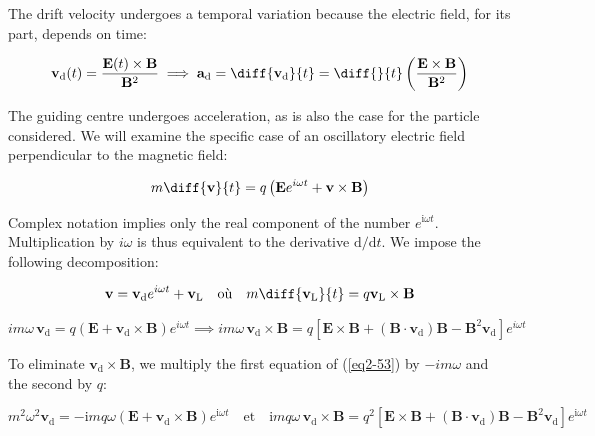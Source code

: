 The drift velocity undergoes a temporal variation because the electric field, for its part, depends on time:

\begin{equation}
    \mathbf{v}_\mathrm{d}(t)=\frac{\mathbf{E}(t)\times\mathbf{B}}{\mathbf{B}^2}\implies\mathbf{a}_\mathrm{d}=\diff{\mathbf{v}_\mathrm{d}}{t}=\diff{}{t}\left(\frac{\mathbf{E}\times\mathbf{B}}{\mathbf{B}^2}\right)
\end{equation}

The guiding centre undergoes acceleration, as is also the case for the particle considered. We will examine the specific case of an oscillatory electric field perpendicular to the magnetic field:

\begin{equation}
    m\diff{\mathbf{v}}{t}=q\left(\mathbf{E}e^{i\omega t}+\mathbf{v}\times\mathbf{B}\right)
\end{equation}

Complex notation implies only the real component of the number $e^{\mathrm{i}\omega t}$. Multiplication by $i\omega$ is thus equivalent to the derivative $\mathrm{d}/\mathrm{d}t$. We impose the following decomposition:

\begin{equation}
    \label{eq2-52}
    \mathbf{v}=\mathbf{v}_\mathrm{d}e^{i\omega t}+\mathbf{v}_\text{L}\quad\text{où}\quad m\diff{\mathbf{v}_\text{L}}{t}=q\mathbf{v}_\text{L}\times\mathbf{B}
\end{equation}

\begin{equation}
    \label{eq2-53}
    im\omega\,\mathbf{v}_\mathrm{d}=q\left(\mathbf{E}+\mathbf{v}_\mathrm{d}\times\mathbf{B}\right)e^{i\omega t}\implies im\omega\,\mathbf{v}_\mathrm{d}\times\mathbf{B}=q\left[\mathbf{E}\times\mathbf{B}+(\mathbf{B\cdot\mathbf{v}_\mathrm{d}})\mathbf{B}-\mathbf{B}^2\mathbf{v}_\mathrm{d}\right]e^{i\omega t}
\end{equation}

To eliminate $\mathbf{v}_\mathrm{d}\times\mathbf{B}$, we multiply the first equation of (\ref{eq2-53}) by $-im\omega$ and the second by $q$:

\begin{equation}
    m^2\omega^2\mathbf{v}_\mathrm{d}=-\mathrm{i}mq\omega\left(\mathbf{E}+\mathbf{v}_\mathrm{d}\times\mathbf{B}\right)e^{\mathrm{i}\omega t}\quad\text{et}\quad\mathrm{i}mq\omega\,\mathbf{v}_\mathrm{d}\times\mathbf{B}=q^2\left[\mathbf{E}\times\mathbf{B}+(\mathbf{B}\cdot\mathbf{v}_\mathrm{d})\mathbf{B}-\mathbf{B}^2\mathbf{v}_\mathrm{d}\right]e^{\mathrm{i}\omega t}
\end{equation}

